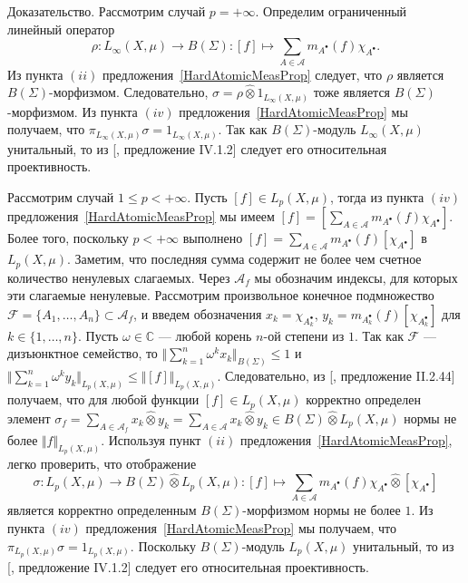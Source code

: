 \documentclass[12pt]{article}
\numberwithin{equation}{subsection}
\theoremstyle{plain}
\newenvironment{proof}{Доказательство.}{}
\newcommand{\projtens}{\mathbin{\widehat{\otimes}}}
\begin{document}
\begin{fulltext}
\begin{proof}
        Рассмотрим случай $p=+\infty$. Определим ограниченный линейный оператор
        $$
            \rho:L_\infty(X,\mu)\to B(\Sigma):
            [f]\mapsto\sum_{A\in\mathcal{A}}m_{A^\bullet}(f)\chi_{A^\bullet}.
        $$
        Из пункта $(ii)$ предложения~\ref{HardAtomicMeasProp} следует, что
        $\rho$ является $B(\Sigma)$-морфизмом. Следовательно,
        $\sigma=\rho\projtens 1_{L_\infty(X,\mu)}$ тоже является
        $B(\Sigma)$-морфизмом. Из пункта $(iv)$
        предложения~\ref{HardAtomicMeasProp} мы получаем, что
        $\pi_{L_\infty(X,\mu)}\sigma=1_{L_\infty(X,\mu)}$. Так как
        $B(\Sigma)$-модуль $L_\infty(X,\mu)$ унитальный, то из
        [\cite{HelHomolBanTopAlg}, предложение IV.1.2] следует его относительная
        проективность.

        Рассмотрим случай $1\leq p<+\infty$. Пусть $[f]\in L_p(X,\mu)$, тогда из
        пункта $(iv)$ предложения~\ref{HardAtomicMeasProp} мы имеем
        $[f]=[\sum_{A\in\mathcal{A}}m_{A^\bullet}(f)\chi_{A^\bullet}]$. Более
        того, поскольку $p<+\infty$ выполнено
        $[f]=\sum_{A\in\mathcal{A}}m_{A^\bullet}(f)[\chi_{A^\bullet}]$ в
        $L_p(X,\mu)$. Заметим, что последняя сумма содержит не более чем счетное
        количество ненулевых слагаемых. Через $\mathcal{A}_f$ мы обозначим
        индексы, для которых эти слагаемые ненулевые. Рассмотрим произвольное
        конечное подмножество
        $\mathcal{F}=\{A_1,\ldots,A_n\}\subset\mathcal{A}_f$, и введем
        обозначения $x_k=\chi_{A_k^\bullet}$,
        $y_k=m_{A_k^\bullet}(f)[\chi_{A_k^\bullet}]$ для $k\in \{1,\ldots,n \}$.
        Пусть $\omega\in\mathbb{C}$ --- любой корень $n$-ой степени из $1$. Так
        как $\mathcal{F}$ --- дизъюнктное семейство, то $\Vert\sum_{k=1}^n
            \omega^k x_k\Vert_{B(\Sigma)}\leq 1$ и $\Vert \sum_{k=1}^n\omega^k
            y_k\Vert_{L_p(X,\mu)}\leq\Vert [f]\Vert_{L_p(X,\mu)}$.
        Следовательно, из
        [\cite{HelHomolBanTopAlg}, предложение II.2.44] получаем, что для любой
        функции $[f]\in L_p(X,\mu)$ корректно определен элемент
        $\sigma_f=\sum_{A\in\mathcal{A}_f} x_k\projtens
            y_k=\sum_{A\in\mathcal{A}} x_k\projtens y_k\in B(\Sigma)\projtens
            L_p(X,\mu)$ нормы не более $\Vert f\Vert_{L_p(X,\mu)}$. Используя
        пункт $(ii)$ предложения~\ref{HardAtomicMeasProp}, легко проверить, что
        отображение
        $$
            \sigma: L_p(X,\mu)\to B(\Sigma)\projtens L_p(X,\mu):
            [f]\mapsto \sum_{A\in\mathcal{A}}
            m_{A^\bullet}(f)\chi_{A^\bullet}\projtens[\chi_{A^\bullet}]
        $$
        является корректно определенным $B(\Sigma)$-морфизмом нормы не более
        $1$. Из пункта $(iv)$ предложения~\ref{HardAtomicMeasProp} мы получаем,
        что $\pi_{L_p(X,\mu)}\sigma=1_{L_p(X,\mu)}$. Поскольку
        $B(\Sigma)$-модуль $L_p(X,\mu)$ унитальный, то из
        [\cite{HelHomolBanTopAlg}, предложение IV.1.2] следует его относительная
        проективность.
    \end{proof}


\end{fulltext}
\end{document}
